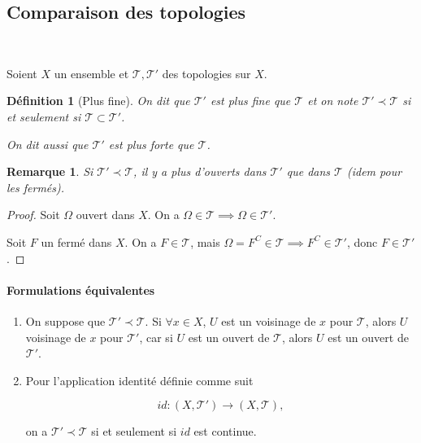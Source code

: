 \documentclass[french]{book}
\newtheorem{definition}{Définition}[section]
\newtheorem*{remark}{Remarque}
\begin{document}
\subsection{Comparaison des topologies}

\

Soient $X$ un ensemble et $\mathscr{T}, \mathscr{T}' $ des topologies sur $X$.

\begin{definition}[Plus fine]
  On dit que $\mathscr{T}' $ est plus fine que $\mathscr{T} $ et on note $\mathscr{T}' \prec \mathscr{T}  $ si et seulement si $\mathscr{T} \subset \mathscr{T}' $.

  On dit aussi que $\mathscr{T}' $ est plus forte que $\mathscr{T} $.
\end{definition}

\begin{remark}
  Si $\mathscr{T}' \prec \mathscr{T}  $, il y a plus d'ouverts dans $\mathscr{T}' $ que dans $\mathscr{T} $ (idem pour les fermés).
\end{remark}

\begin{proof}
  Soit $\Omega$ ouvert dans $X$. On a $\Omega \in \mathscr{T}  \implies \Omega \in \mathscr{T}' $.

  Soit $F$ un fermé dans $X$. On a $F \in \mathscr{T}$, mais $ \Omega = F ^{C} \in \mathscr{T} \implies F ^{C} \in \mathscr{T}' $, donc $F \in \mathscr{T}' $.
\end{proof}

\paragraph{Formulations équivalentes}

\begin{enumerate}
  \item On suppose que $\mathscr{T}' \prec \mathscr{T} $. Si $\forall x \in X $, $U$ est un voisinage de  $x$ pour $\mathscr{T} $, alors $U $ voisinage de $x$ pour $\mathscr{T}' $, car si $U $ est un ouvert de $\mathscr{T} $, alors $U $ est un ouvert de $ \mathscr{T}' $.
  \item Pour l'application identité définie comme suit

  $$ id : (X, \mathscr{T}' ) \longrightarrow (X, \mathscr{T} ), $$


  on a $\mathscr{T}' \prec \mathscr{T}  $ si et seulement si $id $ est continue.
\end{enumerate}
\end{document}
